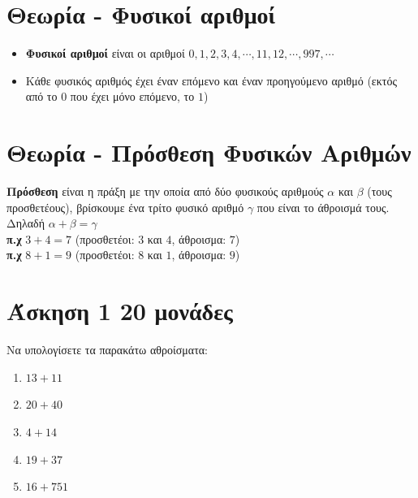 \documentclass[a4paper,10pt]{report}
\begin{document}
\section*{Θεωρία - Φυσικοί αριθμοί\hfill \small{}}
\begin{itemize}
 \item \textbf{Φυσικοί αριθμοί} είναι οι αριθμοί $0,1,2,3,4,\cdots ,11,12,\cdots , 997, \cdots$
 \item Κάθε φυσικός αριθμός έχει έναν επόμενο και έναν προηγούμενο αριθμό (εκτός από το $0$ που έχει 
       μόνο επόμενο, το $1$)
\end{itemize}

\section*{Θεωρία - Πρόσθεση Φυσικών Αριθμών \hfill \small{}}
\textbf{Πρόσθεση} είναι η πράξη με την οποία από δύο φυσικούς αριθμούς $α$ και $β$ (τους προσθετέους), 
βρίσκουμε ένα τρίτο φυσικό αριθμό $γ$ που είναι το άθροισμά τους. Δηλαδή $α+β=γ$\\
\textbf{π.χ} $3+4=7$ (προσθετέοι: $3$ και $4$, άθροισμα: $7$)\\
\textbf{π.χ} $8+1=9$ (προσθετέοι: $8$ και $1$, άθροισμα: $9$)

\section*{Άσκηση 1  \hfill \small{20 μονάδες}}
Να υπολογίσετε τα παρακάτω αθροίσματα: 
\begin{enumerate} [1)]
 \item $13+11$
 \item $20+40$
 \item $4+14$
 \item $19+37$
 \item $16+751$
\end{enumerate}
\end{document}

